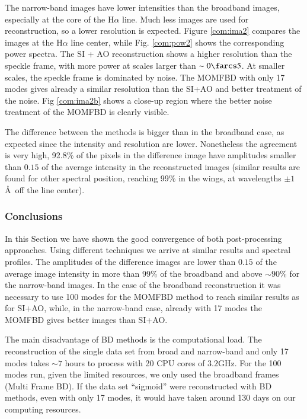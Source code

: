 The narrow-band images have lower intensities than the broadband images, especially at the core of the H$\alpha$ line. Much less images are used for reconstruction, so a lower resolution is expected. Figure \ref{com:ima2} compares the images at the H$\alpha$ line center, while Fig.  \ref{com:pow2} shows the corresponding power spectra. The SI + AO reconstruction shows a higher resolution than the speckle frame, with more power at scales  larger than  $\sim 0\farcs5$. At smaller scales, the speckle frame is dominated by noise. The MOMFBD with only 17 modes gives already a similar resolution than the SI+AO and better treatment of the noise. Fig \ref{com:ima2b} shows a close-up region where the better noise treatment of the MOMFBD is clearly visible.

The difference between the methods is bigger than in the broadband case, as expected since the intensity and resolution are lower. Nonetheless the agreement is very high, 92.8\% of the pixels in the difference image have amplitudes smaller than $0.15$ of the average intensity in the reconstructed images (similar results are found for other spectral position, reaching 99\% in the wings, at wavelengths $\pm 1 $ \AA\, off the line center).



\subsubsection*{Conclusions}
In this Section we have shown the good convergence  of both post-processing approaches. Using different techniques we arrive at similar results and spectral profiles. The amplitudes of the difference images are lower than $0.15$ of the average image intensity in more than 99\% of the broadband and above $\sim90$\% for the narrow-band images. In the case of the broadband reconstruction it was necessary to use 100 modes for the MOMFBD method to reach similar results as for SI+AO, while, in the narrow-band case, already with 17 modes the MOMFBD gives better images than SI+AO.

The main disadvantage of BD methods is the computational load. The reconstruction of the single data set from broad and narrow-band and only 17 modes takes $\sim7$ hours to process with 20 CPU cores of $3.2$GHz. For the 100 modes run, given the limited resources, we only used the broadband frames (Multi Frame BD). If the data set ``sigmoid'' were reconstructed with BD methods, even with only 17 modes, it would have taken around 130 days on our computing resources.

